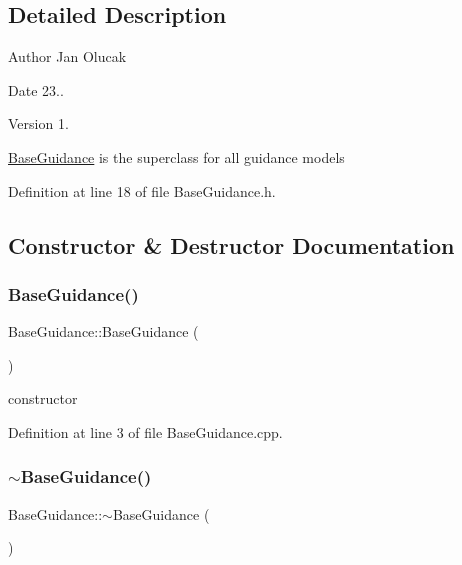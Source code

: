 \subsection{Detailed Description}
\begin{DoxyAuthor}{Author}
Jan Olucak 
\end{DoxyAuthor}
\begin{DoxyDate}{Date}
23.. 
\end{DoxyDate}
\begin{DoxyVersion}{Version}
1.
\end{DoxyVersion}
\hyperlink{class_base_guidance}{Base\+Guidance} is the superclass for all guidance models 

Definition at line 18 of file Base\+Guidance.\+h.



\subsection{Constructor \& Destructor Documentation}
\mbox{\label{class_base_guidance_aa96d54da1d306fcfbf05705eabc91c55}} 
\subsubsection{\texorpdfstring{Base\+Guidance()}{BaseGuidance()}}
{\footnotesize\ttfamily Base\+Guidance\+::\+Base\+Guidance (\begin{DoxyParamCaption}{ }\end{DoxyParamCaption})}



constructor 



Definition at line 3 of file Base\+Guidance.\+cpp.

\mbox{\label{class_base_guidance_a28666e14c8ecedcfb33191ee273316c6}} 
\subsubsection{\texorpdfstring{$\sim$\+Base\+Guidance()}{~BaseGuidance()}}
{\footnotesize\ttfamily Base\+Guidance\+::$\sim$\+Base\+Guidance (\begin{DoxyParamCaption}{ }\end{DoxyParamCaption})}




